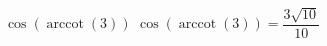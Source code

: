  {$\cos\left(\operatorname{arccot}\left( 3 \right)\right)$}
{ $\cos\left(\operatorname{arccot}\left( 3 \right)\right) = \dfrac{3\sqrt{10}}{10}$}
